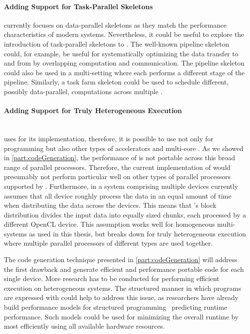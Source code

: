 \paragraph{Adding Support for Task-Parallel Skeletons}
\SkelCL currently focuses on data-parallel skeletons as they match the performance characteristics of modern \GPU systems.
Nevertheless, it could be useful to explore the introduction of task-parallel skeletons to \SkelCL.
The well-known pipeline skeleton could, for example, be useful for systematically optimizing the data transfer to and from \GPUs by overlapping computation and communication.
The pipeline skeleton could also be used in a multi-\GPU setting where each \GPU performs a different stage of the pipeline.
Similarly, a task farm skeleton could be used to schedule different, possibly data-parallel, computations across multiple \GPUs.

\paragraph{Adding Support for Truly Heterogeneous Execution}\hfill\\
\SkelCL uses \OpenCL for its implementation, therefore, it is possible to use \SkelCL not only for programming \GPUs but also other types of accelerators and multi-core \CPUs.
As we showed in \autoref{part:codeGeneration}, the performance of \OpenCL is not portable across this broad range of parallel processors.
Therefore, the current implementation of \SkelCL would presumably not perform particular well on other types of parallel processors supported by \OpenCL.
Furthermore, in a system comprising multiple \OpenCL devices \SkelCL currently assumes that all device roughly process the data in an equal amount of time when distributing the data across the devices.
This means that \SkelCL's block distribution divides the input data into equally sized chunks, each processed by a different OpenCL device.
This assumption works well for homogeneous multi-\GPU systems as used in this thesis, but breaks down for truly heterogeneous execution where multiple parallel processors of different types are used together.

The code generation technique presented in \autoref{part:codeGeneration} will address the first drawback and generate efficient and performance portable code for each single \OpenCL device.
More research has to be conducted for performing efficient execution on heterogeneous systems.
The structured manner in which programs are expressed with \SkelCL could help to address this issue, as researchers have already build performance models for structured programming~\cite{HayashiC02,BischofGK03,Alt2007,DarlingtonFHKSW93,StegmeierFrJAUn2015} predicting runtime performance.
Such models could be used for minimizing the overall runtime by most efficiently using all available hardware resources.


